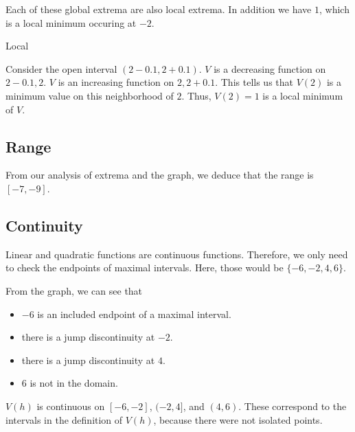 \documentclass{ximera}
\begin{document}
Each of these global extrema are also local extrema.  In addition we have $1$, which is a local minimum occuring at $-2$.  

\begin{explanation} Local


Consider the open interval $(2 - 0.1, 2 + 0.1)$. $V$ is a decreasing function on $2 - 0.1, 2$. $V$ is an increasing function on $2, 2 + 0.1$.  This tells us that $V(2)$ is a minimum value on this neighborhood of $2$.  Thus, $V(2)=1$ is a local minimum of $V$.


\end{explanation}













\subsection{Range} 

From our analysis of extrema and the graph, we deduce that the range is $[-7, -9]$.





\subsection{Continuity} 


Linear and quadratic functions are continuous functions.  Therefore, we only need to check the endpoints of maximal intervals.  Here, those would be $\{ -6, -2, 4, 6 \}$.

From the graph, we can see that 

\begin{itemize}
\item $-6$ is an included endpoint of a maximal interval.  
\item there is a jump discontinuity at $-2$.
\item there is a jump discontinuity at $4$.
\item $6$ is not in the domain.
\end{itemize}


$V(h)$ is continuous on $[-6, -2]$, $(-2, 4]$, and $(4, 6)$.  These correspond to the intervals in the definition of $V(h)$, because there were not isolated points.
\end{document}
